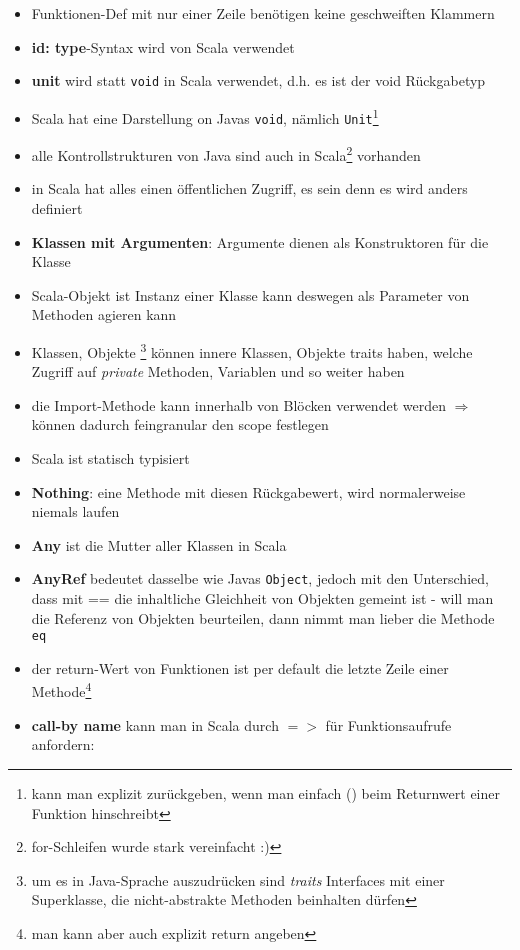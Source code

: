 \begin{itemize}
  \item Funktionen-Def mit nur einer Zeile benötigen keine geschweiften Klammern
  \item \textbf{id: type}-Syntax wird von Scala verwendet 
  \item \textbf{unit} wird statt \texttt{void} in Scala verwendet, d.h. es ist der
  void Rückgabetyp
  \item Scala hat eine Darstellung on Javas \texttt{void}, nämlich 
  \texttt{Unit}\footnote{kann man explizit zurückgeben, wenn man einfach
  () beim Returnwert einer Funktion hinschreibt}
  \item alle Kontrollstrukturen von Java sind auch in 
  Scala\footnote{for-Schleifen wurde stark vereinfacht :)} vorhanden
  \item in Scala hat alles einen öffentlichen Zugriff, es sein denn
  es wird anders definiert
  \item \textbf{Klassen mit Argumenten}: Argumente dienen als
  Konstruktoren für die Klasse
  
    

  \item Scala-Objekt ist Instanz einer Klasse \und kann deswegen als
  Parameter von Methoden agieren kann
  \item Klassen, Objekte \und {}\footnote{um es in Java-Sprache
  auszudrücken sind \textit{traits} Interfaces mit einer Superklasse, die
  nicht-abstrakte Methoden beinhalten dürfen} können innere Klassen, Objekte
  \und traits haben, welche Zugriff auf \textit{private} Methoden,
  Variablen und so weiter haben
  \item die Import-Methode kann innerhalb von Blöcken verwendet werden
  $\Rightarrow$ können dadurch feingranular den scope festlegen
  \item Scala ist statisch typisiert
  \item \textbf{Nothing}: eine Methode mit diesen Rückgabewert, wird
  normalerweise niemals laufen
  \item \textbf{Any} ist die Mutter aller Klassen in Scala
  \item \textbf{AnyRef} bedeutet dasselbe wie Javas \texttt{Object},
  jedoch mit den Unterschied, dass mit == die inhaltliche Gleichheit von 
  Objekten gemeint ist - will man die Referenz von Objekten beurteilen,
  dann nimmt man lieber die Methode \texttt{eq}
  \item der return-Wert von Funktionen ist per default die letzte Zeile einer
  Methode\footnote{man kann aber auch explizit return angeben}
  \item \textbf{call-by name} kann man in Scala durch $=>$ für Funktionsaufrufe 
  anfordern:
  

\end{itemize}
